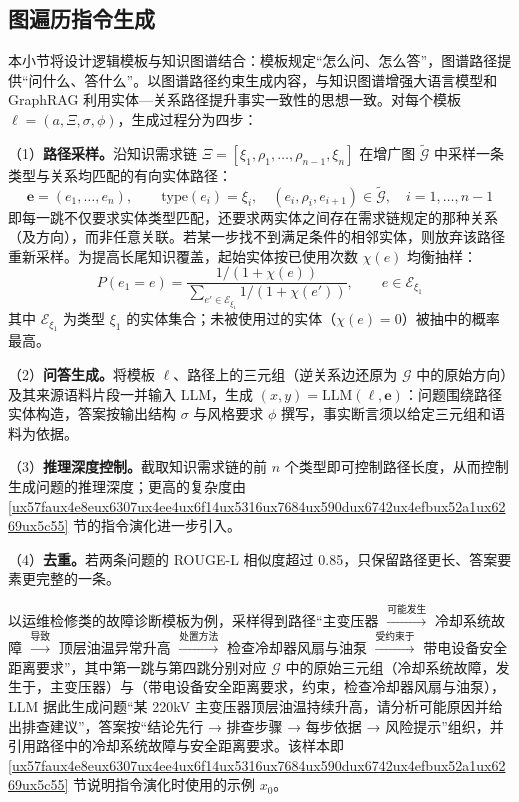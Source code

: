 \documentclass[fontset=fandol,type=master,campus=shenzhen,etitleauto=true]{hithesisbook}
\begin{document}
\subsection{图遍历指令生成}\label{ux903bux8f91ux6a21ux677fux9a71ux52a8ux7684ux56feux904dux5386ux751fux6210}

本小节将设计逻辑模板与知识图谱结合：模板规定“怎么问、怎么答”，图谱路径提供“问什么、答什么”。以图谱路径约束生成内容，与知识图谱增强大语言模型和 GraphRAG 利用实体—关系路径提升事实一致性的思想一致\cite{ref15,ref16}。对每个模板 $\ell = (a, \Xi, \sigma, \phi)$，生成过程分为四步：

（1）\textbf{路径采样。}沿知识需求链 $\Xi = [\xi_1, \rho_1, \ldots, \rho_{n-1}, \xi_n]$ 在增广图 $\tilde{\mathcal{G}}$ 中采样一条类型与关系均匹配的有向实体路径：
\begin{equation}\label{eq:path}
\mathbf{e} = (e_1, \ldots, e_n), \qquad \text{type}(e_i) = \xi_i, \quad (e_i, \rho_i, e_{i+1}) \in \tilde{\mathcal{G}}, \quad i = 1, \ldots, n-1
\end{equation}
即每一跳不仅要求实体类型匹配，还要求两实体之间存在需求链规定的那种关系（及方向），而非任意关联。若某一步找不到满足条件的相邻实体，则放弃该路径重新采样。为提高长尾知识覆盖，起始实体按已使用次数 $\chi(e)$ 均衡抽样：
\begin{equation}\label{eq:start-entity}
P(e_1 = e) = \frac{1 / (1 + \chi(e))}{\sum_{e' \in \mathcal{E}_{\xi_1}} 1 / (1 + \chi(e'))}, \qquad e \in \mathcal{E}_{\xi_1}
\end{equation}
其中 $\mathcal{E}_{\xi_1}$ 为类型 $\xi_1$ 的实体集合；未被使用过的实体（$\chi(e) = 0$）被抽中的概率最高。

（2）\textbf{问答生成。}将模板 $\ell$、路径上的三元组（逆关系边还原为 $\mathcal{G}$ 中的原始方向）及其来源语料片段一并输入 LLM，生成 $(x, y) = \text{LLM}(\ell, \mathbf{e})$：问题围绕路径实体构造，答案按输出结构 $\sigma$ 与风格要求 $\phi$ 撰写，事实断言须以给定三元组和语料为依据。

（3）\textbf{推理深度控制。}截取知识需求链的前 $n$ 个类型即可控制路径长度，从而控制生成问题的推理深度；更高的复杂度由 \ref{ux57faux4e8eux6307ux4ee4ux6f14ux5316ux7684ux590dux6742ux4efbux52a1ux6269ux5c55} 节的指令演化进一步引入。

（4）\textbf{去重。}若两条问题的 ROUGE-L 相似度\cite{ref75}超过 0.85，只保留路径更长、答案要素更完整的一条。

以运维检修类的故障诊断模板为例，采样得到路径“主变压器 $\xrightarrow{\text{可能发生}}$ 冷却系统故障 $\xrightarrow{\text{导致}}$ 顶层油温异常升高 $\xrightarrow{\text{处置方法}}$ 检查冷却器风扇与油泵 $\xrightarrow{\text{受约束于}}$ 带电设备安全距离要求”，其中第一跳与第四跳分别对应 $\mathcal{G}$ 中的原始三元组（冷却系统故障，发生于，主变压器）与（带电设备安全距离要求，约束，检查冷却器风扇与油泵），LLM 据此生成问题“某 220kV 主变压器顶层油温持续升高，请分析可能原因并给出排查建议”，答案按“结论先行 → 排查步骤 → 每步依据 → 风险提示”组织，并引用路径中的冷却系统故障与安全距离要求。该样本即 \ref{ux57faux4e8eux6307ux4ee4ux6f14ux5316ux7684ux590dux6742ux4efbux52a1ux6269ux5c55} 节说明指令演化时使用的示例 $x_0$。
\end{document}
